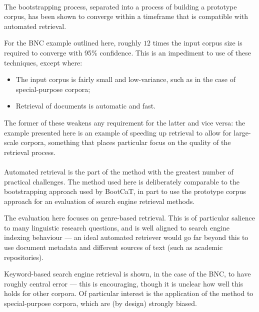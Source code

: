 \paragraph{}

The bootstrapping process, separated into a process of building a prototype corpus, has been shown to converge within a timeframe that is compatible with automated retrieval.

For the BNC example outlined here, roughly $12$ times the input corpus size is required to converge with 95\% confidence.  This is an impediment to use of these techniques, except where:

\begin{itemize}
    \item The input corpus is fairly small and low-variance, such as in the case of special-purpose corpora;
    \item Retrieval of documents is automatic and fast.
\end{itemize}

The former of these weakens any requirement for the latter and vice versa: the example presented here is an example of speeding up retrieval to allow for large-scale corpora, something that places particular focus on the quality of the retrieval process.


\paragraph{}

Automated retrieval is the part of the method with the greatest number of practical challenges. The method used here is deliberately comparable to the bootstrapping approach used by BootCaT, in part to use the prototype corpus approach for an evaluation of search engine retrieval methods.

The evaluation here focuses on genre-based retrieval.  This is of particular salience to many linguistic research questions, and is well aligned to search engine indexing behaviour --- an ideal automated retriever would go far beyond this to use document metadata and different sources of text (such as academic repositories).

Keyword-based search engine retrieval is shown, in the case of the BNC, to have roughly central error --- this is encouraging, though it is unclear how well this holds for other corpora.  Of particular interest is the application of the method to special-purpose corpora, which are (by design) strongly biased.

